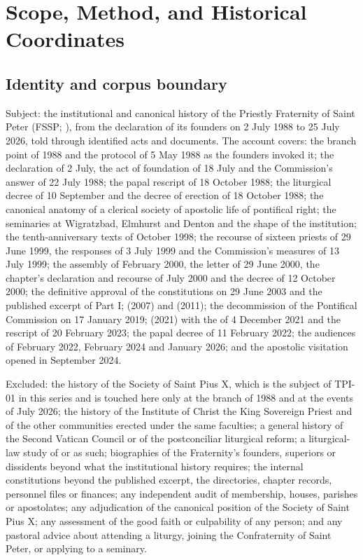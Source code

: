 \section{Scope, Method, and Historical Coordinates}

\subsection{Identity and corpus boundary}

Subject: the institutional and canonical history of the Priestly
Fraternity of Saint Peter (FSSP; ), from the declaration of its founders on 2 July 1988 to 25 July
2026, told through identified acts and documents. The account covers: the
branch point of 1988 and the protocol of 5 May 1988 as the founders
invoked it; the declaration of 2 July, the act of foundation of 18 July
and the Commission's answer of 22 July 1988; the papal rescript
 of 18 October 1988; the liturgical decree of
10 September and the decree of erection of 18 October 1988; the canonical
anatomy of a clerical society of apostolic life of pontifical right; the
seminaries at Wigratzbad, Elmhurst and Denton and the shape of the
institution; the tenth-anniversary texts of October 1998; the recourse of
sixteen priests of 29 June 1999, the responses of 3 July 1999 and the
Commission's measures of 13 July 1999; the assembly of February 2000, the
letter of 29 June 2000, the chapter's declaration and recourse of July
2000 and the decree of 12 October 2000; the definitive approval of the
constitutions on 29 June 2003 and the published excerpt of Part I;
 (2007) and  (2011);
the decommission of the Pontifical Commission on 17 January 2019;
 (2021) with the  of 4 December
2021 and the rescript of 20 February 2023; the papal decree of 11
February 2022; the audiences of February 2022, February 2024 and January
2026; and the apostolic visitation opened in September 2024.

Excluded: the history of the Society of Saint Pius X, which is the
subject of TPI-01 in this series and is touched here only at the branch of
1988 and at the events of July 2026; the history of the Institute of
Christ the King Sovereign Priest and of the other communities erected
under the same faculties; a general history of the Second Vatican Council
or of the postconciliar liturgical reform; a liturgical-law study of
 or  as such;
biographies of the Fraternity's founders, superiors or dissidents beyond
what the institutional history requires; the internal constitutions
beyond the published excerpt, the directories, chapter records, personnel
files or finances; any independent audit of membership, houses, parishes
or apostolates; any adjudication of the canonical position of the Society
of Saint Pius X; any assessment of the good faith or culpability of any
person; and any pastoral advice about attending a liturgy, joining the
Confraternity of Saint Peter, or applying to a seminary.

